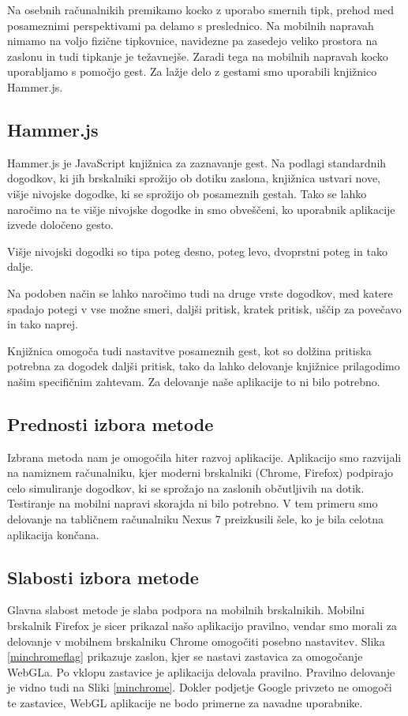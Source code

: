 Na osebnih računalnikih premikamo kocko z uporabo smernih tipk, prehod med posameznimi perspektivami pa delamo s preslednico. Na mobilnih napravah nimamo na voljo fizične tipkovnice, navidezne pa zasedejo veliko prostora na zaslonu in tudi tipkanje je težavnejše. Zaradi tega na mobilnih napravah kocko uporabljamo s pomočjo gest. Za lažje delo z gestami smo uporabili knjižnico Hammer.js.

\subsection*{Hammer.js}

Hammer.js je JavaScript knjižnica za zaznavanje gest. Na podlagi standardnih dogodkov, ki jih brskalniki sprožijo ob dotiku zaslona, knjižnica ustvari nove, višje nivojske dogodke, ki se sprožijo ob posameznih gestah. Tako se lahko naročimo na te višje nivojske dogodke in smo obveščeni, ko uporabnik aplikacije izvede določeno gesto.

Višje nivojski dogodki so tipa poteg desno, poteg levo, dvoprstni poteg in tako dalje. 

Na podoben način se lahko naročimo tudi na druge vrste dogodkov, med katere spadajo potegi v vse možne smeri, daljši pritisk, kratek pritisk, uščip za povečavo in tako naprej.

Knjižnica omogoča tudi nastavitve posameznih gest, kot so dolžina pritiska potrebna za dogodek daljši pritisk, tako da lahko delovanje knjižnice prilagodimo našim specifičnim zahtevam. Za delovanje naše aplikacije to ni bilo potrebno.

\subsection{Prednosti izbora metode}

Izbrana metoda nam je omogočila hiter razvoj aplikacije. Aplikacijo smo razvijali na namiznem računalniku, kjer moderni brskalniki (Chrome, Firefox) podpirajo celo simuliranje dogodkov, ki se sprožajo na zaslonih občutljivih na dotik. Testiranje na mobilni napravi skorajda ni bilo potrebno. V tem primeru smo delovanje na tabličnem računalniku Nexus 7 preizkusili šele, ko je bila celotna aplikacija končana.

\subsection{Slabosti izbora metode}

Glavna slabost metode je slaba podpora na mobilnih brskalnikih. Mobilni brskalnik Firefox je sicer prikazal našo aplikacijo pravilno, vendar smo morali za delovanje v mobilnem brskalniku Chrome omogočiti posebno nastavitev. Slika \ref{minchromeflag} prikazuje zaslon, kjer se nastavi zastavica za omogočanje WebGLa. Po vklopu zastavice je aplikacija delovala pravilno. Pravilno delovanje je vidno tudi na Sliki \ref{minchrome}. Dokler podjetje Google privzeto ne omogoči te zastavice, WebGL aplikacije ne bodo primerne za navadne uporabnike.

